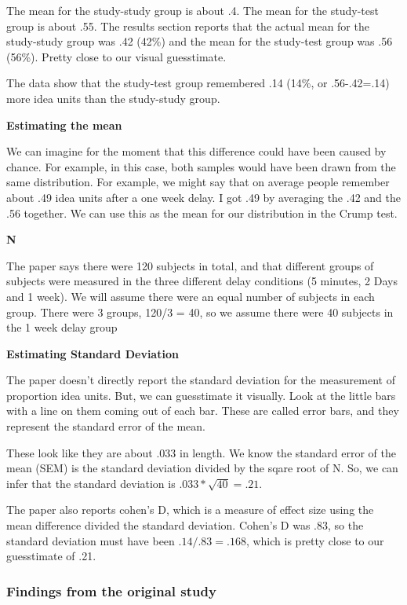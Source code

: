 \documentclass[
]{book}
\begin{document}
The mean for the study-study group is about .4. The mean for the study-test group is about .55. The results section reports that the actual mean for the study-study group was .42 (42\%) and the mean for the study-test group was .56 (56\%). Pretty close to our visual guesstimate.

The data show that the study-test group remembered .14 (14\%, or .56-.42=.14) more idea units than the study-study group.

\textbf{Estimating the mean}

We can imagine for the moment that this difference could have been caused by chance. For example, in this case, both samples would have been drawn from the same distribution. For example, we might say that on average people remember about .49 idea units after a one week delay. I got .49 by averaging the .42 and the .56 together. We can use this as the mean for our distribution in the Crump test.

\textbf{N}

The paper says there were 120 subjects in total, and that different groups of subjects were measured in the three different delay conditions (5 minutes, 2 Days and 1 week). We will assume there were an equal number of subjects in each group. There were 3 groups, 120/3 = 40, so we assume there were 40 subjects in the 1 week delay group

\textbf{Estimating Standard Deviation}

The paper doesn't directly report the standard deviation for the measurement of proportion idea units. But, we can guesstimate it visually. Look at the little bars with a line on them coming out of each bar. These are called error bars, and they represent the standard error of the mean.

These look like they are about .033 in length. We know the standard error of the mean (SEM) is the standard deviation divided by the sqare root of N. So, we can infer that the standard deviation is \(.033 * \sqrt{40} = .21\).

The paper also reports cohen's D, which is a measure of effect size using the mean difference divided the standard deviation. Cohen's D was .83, so the standard deviation must have been \(.14/.83 = .168\), which is pretty close to our guesstimate of .21.

\hypertarget{findings-from-the-original-study}{%
\subsubsection{Findings from the original study}\label{findings-from-the-original-study}}
\end{document}
